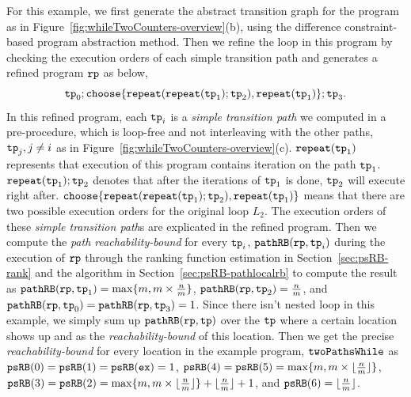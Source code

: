 For this example, we first
generate the abstract transition graph for the program as in Figure~\ref{fig:whileTwoCounters-overview}(b), using the difference constraint-based program abstraction method.
Then we refine the loop in this program by checking the 
execution orders of each simple transition path and
generates a refined program $\mathtt{rp}$ as below,
% 
\[ \tpath_0 ; 
 \rpchoose{
    \rprepeat(\rprepeat(\tpath_1); \tpath_2), 
   \rprepeat(\tpath_1)}; \tpath_3.
\]
In this refined program,
each $\mathtt{tp}_i$ is a \emph{simple transition path} we computed in a pre-procedure, which is loop-free and not interleaving with the other paths, $\mathtt{tp}_j, j \neq i$ as in Figure~\ref{fig:whileTwoCounters-overview}(c).
$\mathtt{repeat}(\mathtt{tp}_1)$ represents that execution of this program contains iteration on the path $\mathtt{tp}_1$.
$\mathtt{repeat}(\mathtt{tp}_1); \mathtt{tp}_2$ denotes that after the iterations of $\mathtt{tp}_1$ is done,
$\mathtt{tp}_2$ will execute right after.
$\rpchoose{
    \rprepeat(\rprepeat(\tpath_1); \tpath_2), 
   \rprepeat(\tpath_1)}$ means that there are two possible execution orders for the original loop $L_2$.
The execution orders of these \emph{simple transition path}s are explicated in the refined program.
Then we compute the \emph{path reachability-bound} for every $\mathtt{tp}_i$,
$\mathtt{pathRB}(\mathtt{rp}, \mathtt{tp}_i)$ during the execution of $\mathtt{rp}$ through the ranking function estimation in Section~\ref{sec:psRB-rank} and the algorithm in Section~\ref{sec:psRB-pathlocalrb} to compute the result as
$\mathtt{pathRB}(\mathtt{rp}, \mathtt{tp}_1) = \max\{m, m \times \frac{n}{m} \}$,
$\mathtt{pathRB}(\mathtt{rp}, \mathtt{tp}_2) = \frac{n}{m}$,
and $\mathtt{pathRB}(\mathtt{rp}, \mathtt{tp}_0) = \mathtt{pathRB}(\mathtt{rp}, \mathtt{tp}_3) = 1$.
Since there isn't nested loop in this example, we simply sum up $\mathtt{pathRB}(\mathtt{rp}, \mathtt{tp})$ over the $\mathtt{tp}$ where a certain location shows up
and as the \emph{reachability-bound} of this location.
Then we get the precise \emph{reachability-bound} for every location in the example program, $\mathtt{twoPathsWhile}$ as
$\mathtt{psRB}(0) = \mathtt{psRB}(1) = \mathtt{psRB}(\mathtt{ex}) = 1$,
$\mathtt{psRB}(4) = \mathtt{psRB}(5) = \max\{m, m \times \lfloor\frac{n}{m}\rfloor\}$,
$\mathtt{psRB}(3) = \mathtt{psRB}(2) = \max\{m, m \times \lfloor\frac{n}{m}\rfloor\} + \lfloor\frac{n}{m}\rfloor + 1 $,
and $\mathtt{psRB}(6) = \lfloor\frac{n}{m}\rfloor$.
%
